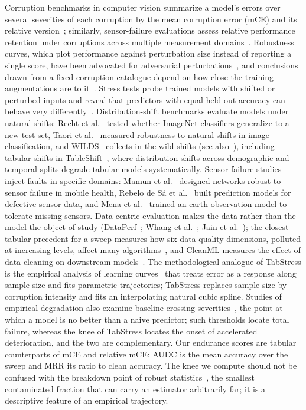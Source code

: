 \documentclass[pdflatex,sn-mathphys]{sn-jnl}
\theoremstyle{thmstyleone}
\theoremstyle{thmstyletwo}
\theoremstyle{thmstylethree}
\begin{document}
Corruption benchmarks in computer vision summarize a model's errors over several severities of each corruption by the mean corruption error (mCE) and its relative version~\cite{hendrycks2019benchmarking}; similarly, sensor-failure evaluations assess relative performance retention under corruptions across multiple measurement domains~\cite{mena2025multisensor}. Robustness curves, which plot performance against perturbation size instead of reporting a single score, have been advocated for adversarial perturbations~\cite{gopfert2020adversarial}, and conclusions drawn from a fixed corruption catalogue depend on how close the training augmentations are to it~\cite{mintun2021interaction}. Stress tests probe trained models with shifted or perturbed inputs and reveal that predictors with equal held-out accuracy can behave very differently~\cite{damour2022underspecification}. Distribution-shift benchmarks evaluate models under natural shifts: Recht et al.~\cite{recht2019imagenet} tested whether ImageNet classifiers generalize to a new test set, Taori et al.~\cite{taori2020measuring} measured robustness to natural shifts in image classification, and WILDS~\cite{koh2021wilds} collects in-the-wild shifts (see also~\cite{quinonero2009dataset}), including tabular shifts in TableShift~\cite{gardner2023tableshift}, where distribution shifts across demographic and temporal splits degrade tabular models systematically. Sensor-failure studies inject faults in specific domains: Mamun et al.~\cite{mamun2022designing} designed networks robust to sensor failure in mobile health, Rebelo de S\'a et al.~\cite{rebelodesa2019building} built prediction models for defective sensor data, and Mena et al.~\cite{mena2025multisensor} trained an earth-observation model to tolerate missing sensors. Data-centric evaluation makes the data rather than the model the object of study (DataPerf~\cite{mazumder2023dataperf}; Whang et al.~\cite{whang2023data}; Jain et al.~\cite{jain2020overview}); the closest tabular precedent for a sweep measures how six data-quality dimensions, polluted at increasing levels, affect many algorithms~\cite{mohammed2025effects}, and CleanML measures the effect of data cleaning on downstream models~\cite{li2021cleanml}. The methodological analogue of TabStress is the empirical analysis of learning curves~\cite{perlich2003tree} that treats error as a response along sample size and fits parametric trajectories; TabStress replaces sample size by corruption intensity and fits an interpolating natural cubic spline. Studies of empirical degradation also examine baseline-crossing severities~\cite{mena2025multisensor}, the point at which a model is no better than a naive predictor; such thresholds locate total failure, whereas the knee of TabStress locates the onset of accelerated deterioration, and the two are complementary. Our endurance scores are tabular counterparts of mCE and relative mCE: AUDC is the mean accuracy over the sweep and MRR its ratio to clean accuracy. The knee we compute should not be confused with the breakdown point of robust statistics~\cite{donoho1983notion}, the smallest contaminated fraction that can carry an estimator arbitrarily far; it is a descriptive feature of an empirical trajectory.
\end{document}
